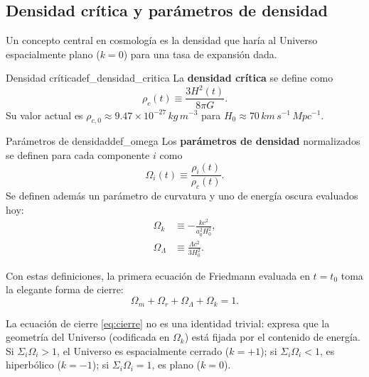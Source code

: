 \subsection{Densidad crítica y parámetros de densidad}

Un concepto central en cosmología es la densidad que haría al Universo espacialmente plano ($k=0$) para una tasa de expansión dada.

\begin{definicion}{Densidad crítica}{def_densidad_critica}
La \textbf{densidad crítica} se define como
\begin{equation}
  \rho_c(t) \equiv \frac{3H^2(t)}{8\pi G}.
  \label{eq:densidad_critica}
\end{equation}
Su valor actual es $\rho_{c,0}\approx 9.47\times10^{-27}\,\si{kg\,m^{-3}}$ para $H_0\approx 70\,\si{km\,s^{-1}\,Mpc^{-1}}$.
\end{definicion}

\begin{definicion}{Parámetros de densidad}{def_omega}
Los \textbf{parámetros de densidad} normalizados se definen para cada componente $i$ como
\begin{equation}
  \Omega_i(t) \equiv \frac{\rho_i(t)}{\rho_c(t)}.
  \label{eq:omega_def}
\end{equation}
Se definen además un parámetro de curvatura y uno de energía oscura evaluados hoy:
\begin{align}
  \Omega_k &\equiv -\frac{kc^2}{a_0^2 H_0^2}, \label{eq:omega_k}\\
  \Omega_\Lambda &\equiv \frac{\Lambda c^2}{3H_0^2}. \label{eq:omega_Lambda}
\end{align}
\end{definicion}

Con estas definiciones, la primera ecuación de Friedmann evaluada en $t=t_0$ toma la elegante forma de cierre:
\begin{equation}
  \boxed{\Omega_m + \Omega_r + \Omega_\Lambda + \Omega_k = 1.}
  \label{eq:cierre}
\end{equation}

\begin{importante}
La ecuación de cierre \eqref{eq:cierre} no es una identidad trivial: expresa que la geometría del Universo (codificada en $\Omega_k$) está fijada por el contenido de energía. Si $\Sigma_i\Omega_i>1$, el Universo es espacialmente cerrado ($k=+1$); si $\Sigma_i\Omega_i<1$, es hiperbólico ($k=-1$); si $\Sigma_i\Omega_i=1$, es plano ($k=0$).
\end{importante}

